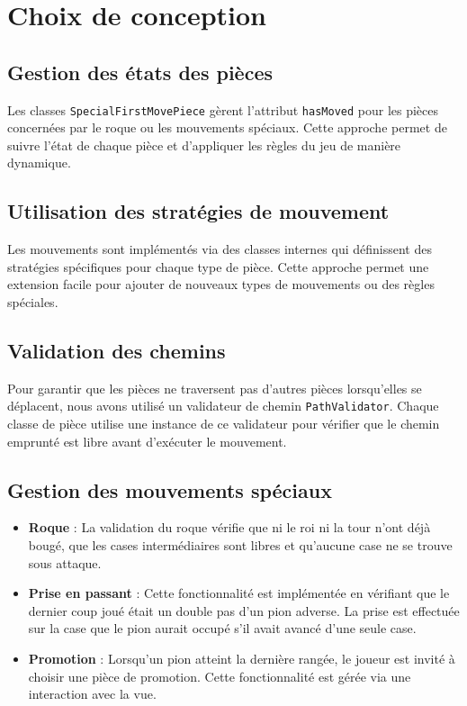 \documentclass[12pt]{report}
\begin{document}



    \section*{Choix de conception}
    \subsection*{Gestion des états des pièces}
    Les classes \texttt{SpecialFirstMovePiece} gèrent l'attribut \texttt{hasMoved} pour les pièces concernées par le roque ou les mouvements spéciaux. Cette approche permet de suivre l'état de chaque pièce et d'appliquer les règles du jeu de manière dynamique.

    \subsection*{Utilisation des stratégies de mouvement}
    Les mouvements sont implémentés via des classes internes qui définissent des stratégies spécifiques pour chaque type de pièce. Cette approche permet une extension facile pour ajouter de nouveaux types de mouvements ou des règles spéciales.

    \subsection*{Validation des chemins}
    Pour garantir que les pièces ne traversent pas d'autres pièces lorsqu'elles se déplacent, nous avons utilisé un validateur de chemin \texttt{PathValidator}. Chaque classe de pièce utilise une instance de ce validateur pour vérifier que le chemin emprunté est libre avant d'exécuter le mouvement.

    \subsection*{Gestion des mouvements spéciaux}
    \begin{itemize}
        \item \textbf{Roque} : La validation du roque vérifie que ni le roi ni la tour n'ont déjà bougé, que les cases intermédiaires sont libres et qu'aucune case ne se trouve sous attaque.
        \item \textbf{Prise en passant} : Cette fonctionnalité est implémentée en vérifiant que le dernier coup joué était un double pas d'un pion adverse. La prise est effectuée sur la case que le pion aurait occupé s'il avait avancé d'une seule case.
        \item \textbf{Promotion} : Lorsqu'un pion atteint la dernière rangée, le joueur est invité à choisir une pièce de promotion. Cette fonctionnalité est gérée via une interaction avec la vue.
    \end{itemize}
\end{document}
